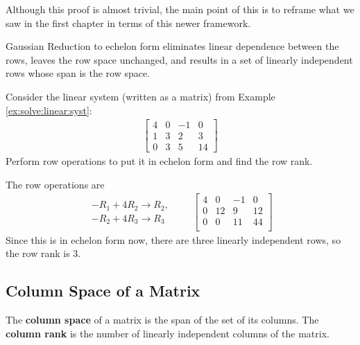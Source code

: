 Although this proof is almost trivial, the main point of this is to reframe what we saw in the first chapter in terms of this newer framework.


\begin{Boxed*}
Gaussian Reduction to echelon form eliminates linear dependence between the rows, leaves the row space unchanged, and results in a set of linearly independent rows whose span is the row space.
\end{Boxed*}

\vspace{2in}

\begin{example}
Consider the linear system (written as a matrix) from Example \ref{ex:solve:linear:syst}:
%
\begin{align*}
\begin{bmatrix}
4 & 0 & -1 & 0 \\
1 & 3 & 2 & 3 \\
0 & 3 & 5 & 14
\end{bmatrix}
\end{align*}
Perform row operations to put it in echelon form and find the row rank.

\solution

The row operations are
\begin{align*}
\begin{array}{r}
-R_1+4R_2 \rightarrow R_2, \\
-R_2 +4R_3 \rightarrow R_3
\end{array}  \qquad
\begin{bmatrix}
4 & 0 & -1 & 0\\
0 & 12 & 9 & 12\\
0 & 0 & 11 & 44\\
\end{bmatrix}
\end{align*}
Since this is in echelon form now, there are three linearly independent rows, so the row rank is 3.
\end{example}


\subsection{Column Space of a Matrix}

\begin{definition}
The \textbf{column space} of a matrix is the span of the set of its columns.  The \textbf{column rank} is the number of linearly independent columns of the matrix.
\end{definition}

